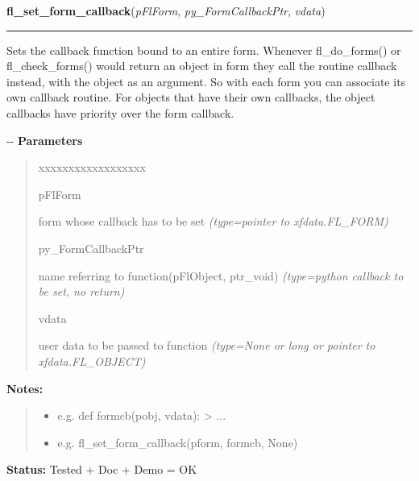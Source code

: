 \hspace{.8\funcindent}\begin{boxedminipage}{\funcwidth}

    \raggedright \textbf{fl\_set\_form\_callback}(\textit{pFlForm}, \textit{py\_FormCallbackPtr}, \textit{vdata})

    \vspace{-1.5ex}

    \rule{\textwidth}{0.5\fboxrule}
\setlength{\parskip}{2ex}

Sets the callback function bound to an entire form. Whenever
fl\_do\_forms() or fl\_check\_forms() would return an object in form they
call the routine callback instead, with the object as an argument. So
with each form you can associate its own callback routine. For objects
that have their own callbacks, the object callbacks have priority over
the form callback.

-{}-
\setlength{\parskip}{1ex}
      \textbf{Parameters}
      \vspace{-1ex}

      \begin{quote}
        \begin{Ventry}{xxxxxxxxxxxxxxxxxx}

          \item[pFlForm]


form whose callback has to be set
            {\it (type=pointer to xfdata.FL\_FORM)}

          \item[py\_FormCallbackPtr]


name referring to function(pFlObject, ptr\_void)
            {\it (type=python callback to be set, no return)}

          \item[vdata]


user data to be passed to function
            {\it (type=None or long or pointer to xfdata.FL\_OBJECT)}

        \end{Ventry}

      \end{quote}

\textbf{Notes:}
\begin{quote}
  \begin{itemize}

  \item
    \setlength{\parskip}{0.6ex}

e.g. def formcb(pobj, vdata): > ...


  \item 
e.g. fl\_set\_form\_callback(pform, formcb, None)


\end{itemize}

\end{quote}

\textbf{Status:} 
Tested + Doc + Demo = OK


    \end{boxedminipage}

